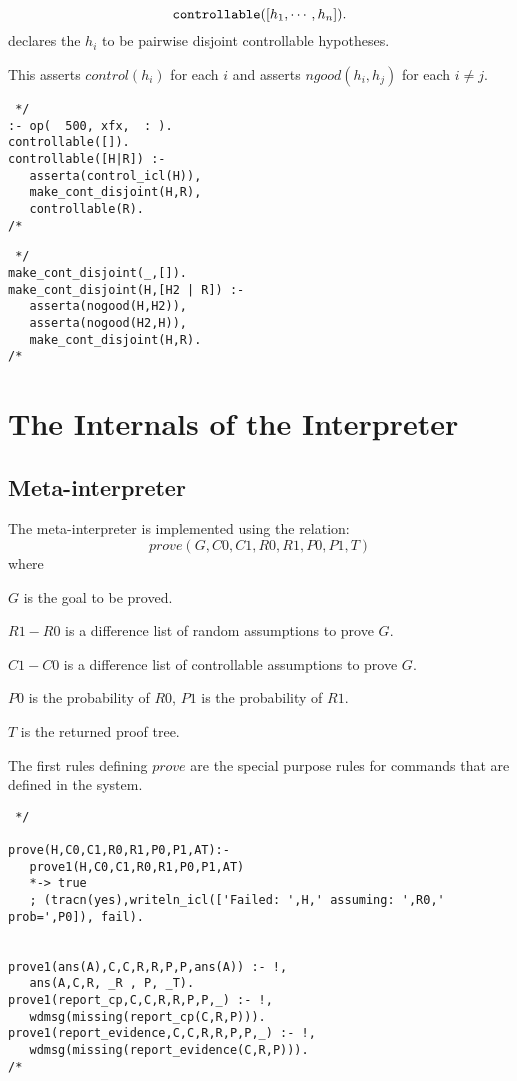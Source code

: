 \documentclass[11pt,fleqn]{article}
\begin{document}
\[\hbox{\ttfamily controllable}([h_1,\cdots,h_n]).\]
declares the $h_i$ to be pairwise disjoint controllable hypotheses.

This asserts $control(h_i)$ for each $i$ and asserts
$ngood(h_i,h_j)$ for each $i \neq j$.

\begin{verbatim} */
:- op(  500, xfx,  : ).
controllable([]).
controllable([H|R]) :-
   asserta(control_icl(H)),
   make_cont_disjoint(H,R),
   controllable(R).
/* \end{verbatim}
\begin{verbatim} */
make_cont_disjoint(_,[]).
make_cont_disjoint(H,[H2 | R]) :-
   asserta(nogood(H,H2)),
   asserta(nogood(H2,H)),
   make_cont_disjoint(H,R).
/* \end{verbatim}

\section{The Internals of the Interpreter}
\subsection{Meta-interpreter}
The meta-interpreter is implemented using the relation:
\[prove(G,C0,C1,R0,R1,P0,P1,T)\]
where
\begin{description}
\item $G$ is the goal to be proved.
\item $R1-R0$ is a difference list of random assumptions to prove $G$.
\item $C1-C0$ is a difference list of controllable assumptions to prove $G$.
\item $P0$ is the probability of $R0$, $P1$ is the probability of $R1$.
\item $T$ is the returned proof tree.
\end{description}
The first rules defining $prove$ are the special purpose rules
for commands that are defined in the system.
\begin{verbatim} */

prove(H,C0,C1,R0,R1,P0,P1,AT):-
   prove1(H,C0,C1,R0,R1,P0,P1,AT)
   *-> true
   ; (tracn(yes),writeln_icl(['Failed: ',H,' assuming: ',R0,' prob=',P0]), fail).


prove1(ans(A),C,C,R,R,P,P,ans(A)) :- !,
   ans(A,C,R, _R , P, _T).
prove1(report_cp,C,C,R,R,P,P,_) :- !,
   wdmsg(missing(report_cp(C,R,P))).
prove1(report_evidence,C,C,R,R,P,P,_) :- !,
   wdmsg(missing(report_evidence(C,R,P))).
/* \end{verbatim}
\end{document}
